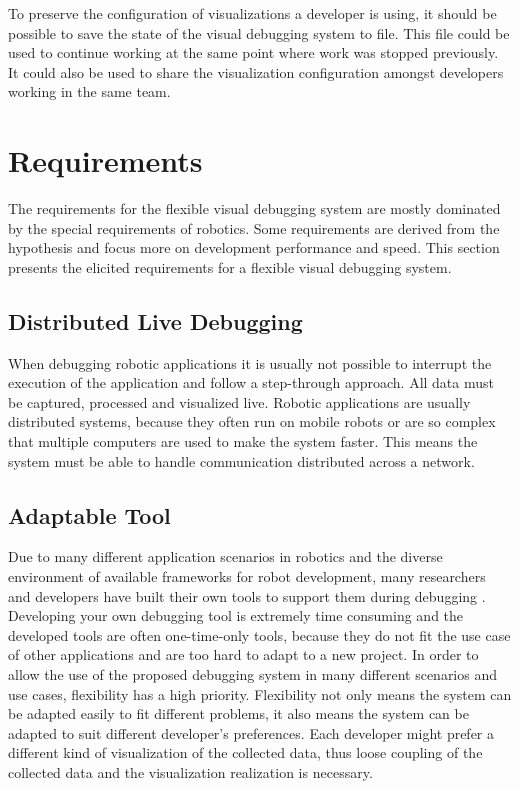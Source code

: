 To preserve the configuration of visualizations a developer is using, it should be possible to save the state of the visual debugging system to file. This file could be used to continue working at the same point where work was stopped previously. It could also be used to share the visualization configuration amongst developers working in the same team.

\section{Requirements}
\label{requirements}
The requirements for the flexible visual debugging system are mostly dominated by the special requirements of robotics. Some requirements are derived from the hypothesis and focus more on development performance and speed. This section presents the elicited requirements for a flexible visual debugging system.

\subsection{Distributed Live Debugging}
When debugging robotic applications it is usually not possible to interrupt the execution of the application and follow a step-through approach. All data must be captured, processed and visualized live. Robotic applications are usually distributed systems, because they often run on mobile robots or are so complex that multiple computers are used to make the system faster. This means the system must be able to handle communication distributed across a network.

\subsection{Adaptable Tool}
Due to many different application scenarios in robotics and the diverse environment of available frameworks for robot development, many researchers and developers have built their own tools to support them during debugging \cite{Collett2010}. Developing your own debugging tool is extremely time consuming and the developed tools are often one-time-only tools, because they do not fit the use case of other applications and are too hard to adapt to a new project.
In order to allow the use of the proposed debugging system in many different scenarios and use cases, flexibility has a high priority. Flexibility not only means the system can be adapted easily to fit different problems, it also means the system can be adapted to suit different developer's preferences. Each developer might prefer a different kind of visualization of the collected data, thus loose coupling of the collected data and the visualization realization is necessary.

